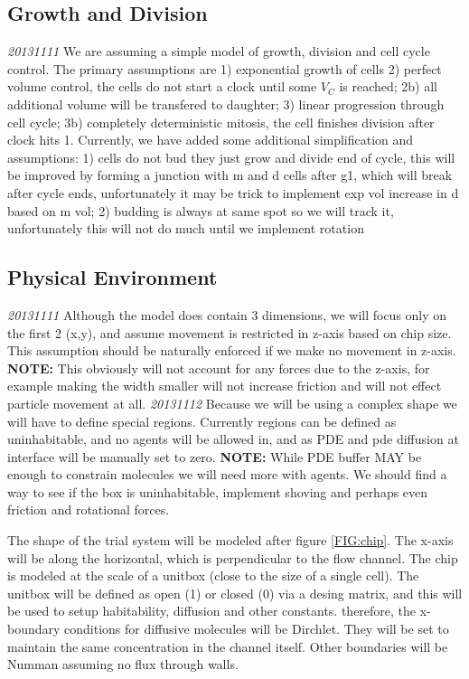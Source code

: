\documentclass{article}
\begin{document}
\subsection{Growth and Division}
\emph{20131111} We are assuming a simple model of growth, division and cell cycle control\cite{Charvin2009}.
The primary assumptions are 1) exponential growth of cells
2) perfect volume control,
the cells do not start a clock until some $V_C$ is reached;
2b) all additional volume will be transfered to daughter;
3) linear progression through cell cycle;
3b) completely deterministic mitosis, 
the cell finishes division after clock hits 1.
Currently, we have added some additional simplification and assumptions:
1) cells do not bud they just grow and divide end of cycle,
this will be improved by forming a junction with m and d cells after g1, 
which will break after cycle ends,
unfortunately it may be trick to implement exp vol increase in d based on m vol;
2) budding is always at same spot so we will track it,
unfortunately this will not do much until we implement rotation

\subsection{Physical Environment}
\emph{20131111} Although the model does contain 3 dimensions,
we will focus only on the first 2 (x,y), 
and assume movement is restricted in z-axis based on chip size.
This assumption should be naturally enforced if we make no movement in z-axis.
\textbf{NOTE:} This obviously will not account for any forces due to the z-axis,
for example making the width smaller will not increase friction and will not effect particle movement at all.
\emph{20131112} Because we will be using a complex shape we will have to define special regions.
Currently regions can be defined as uninhabitable, and no agents will be allowed in, and
as PDE and pde diffusion at interface will be manually set to zero.
\textbf{NOTE:} While PDE buffer MAY be enough to constrain molecules we will need more with agents.
We should find a way to see if the box is uninhabitable, 
implement shoving and perhaps even friction and rotational forces.

The shape of the trial system will be modeled after figure \ref{FIG:chip}.
The x-axis will be along the horizontal, 
which is perpendicular to the flow channel.
The chip is modeled at the scale of a unitbox (close to the size of a single cell).
The unitbox will be defined as open (1) or closed (0) via a desing matrix,
and this will be used to setup habitability, diffusion and other constants.
therefore, the x-boundary conditions for diffusive molecules will be Dirchlet.
They will be set to maintain the same concentration in the channel itself.
Other boundaries will be Numman assuming no flux through walls.
\end{document}
